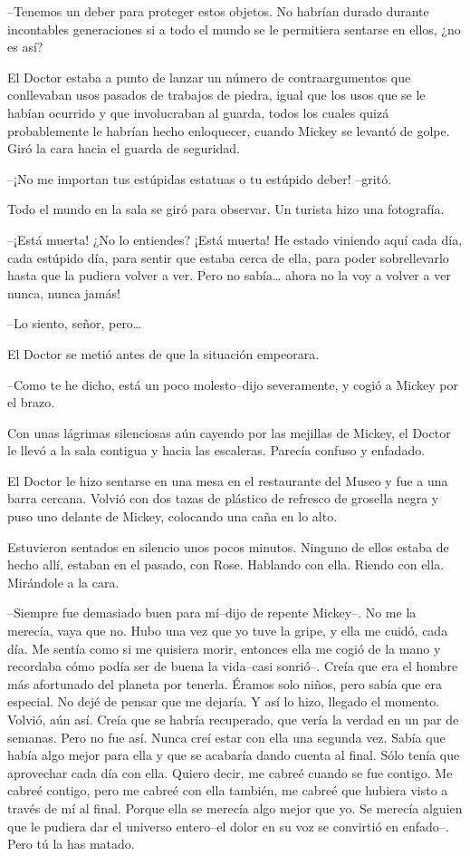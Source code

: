 --Tenemos un deber para proteger estos objetos. No habrían durado
durante incontables generaciones si a todo el mundo se le permitiera
sentarse en ellos, ¿no es así?

El Doctor estaba a punto de lanzar un número de contraargumentos que
conllevaban usos pasados de trabajos de piedra, igual que los usos que
se le habían ocurrido y que involucraban al guarda, todos los cuales
quizá probablemente le habrían hecho enloquecer, cuando Mickey se
levantó de golpe. Giró la cara hacia el guarda de seguridad.

--¡No me importan tus estúpidas estatuas o tu estúpido deber! --gritó.

Todo el mundo en la sala se giró para observar. Un turista hizo una
fotografía.

--¡Está muerta! ¿No lo entiendes? ¡Está muerta! He estado viniendo aquí
cada día, cada estúpido día, para sentir que estaba cerca de ella, para
poder sobrellevarlo hasta que la pudiera volver a ver. Pero no
sabía\ldots{} ahora no la voy a volver a ver nunca, nunca jamás!

--Lo siento, señor, pero\ldots{}

El Doctor se metió antes de que la situación empeorara.

--Como te he dicho, está un poco molesto--dijo severamente, y cogió a
Mickey por el brazo.

Con unas lágrimas silenciosas aún cayendo por las mejillas de Mickey, el
Doctor le llevó a la sala contigua y hacia las escaleras. Parecía
confuso y enfadado.

El Doctor le hizo sentarse en una mesa en el restaurante del Museo y fue
a una barra cercana. Volvió con dos tazas de plástico de refresco de
grosella negra y puso uno delante de Mickey, colocando una caña en lo
alto.

Estuvieron sentados en silencio unos pocos minutos. Ninguno de ellos
estaba de hecho allí, estaban en el pasado, con Rose. Hablando con ella.
Riendo con ella. Mirándole a la cara.

--Siempre fue demasiado buen para mí--dijo de repente Mickey--. No me la
merecía, vaya que no. Hubo una vez que yo tuve la gripe, y ella me
cuidó, cada día. Me sentía como si me quisiera morir, entonces ella me
cogió de la mano y recordaba cómo podía ser de buena la vida--casi
sonrió--. Creía que era el hombre más afortunado del planeta por
tenerla. Éramos solo niños, pero sabía que era especial. No dejé de
pensar que me dejaría. Y así lo hizo, llegado el momento. Volvió, aún
así. Creía que se habría recuperado, que vería la verdad en un par de
semanas. Pero no fue así. Nunca creí estar con ella una segunda vez.
Sabía que había algo mejor para ella y que se acabaría dando cuenta al
final. Sólo tenía que aprovechar cada día con ella. Quiero decir, me
cabreé cuando se fue contigo. Me cabreé contigo, pero me cabreé con ella
también, me cabreé que hubiera visto a través de mí al final. Porque
ella se merecía algo mejor que yo. Se merecía alguien que le pudiera dar
el universo entero--el dolor en su voz se convirtió en enfado--. Pero tú
la has matado.

